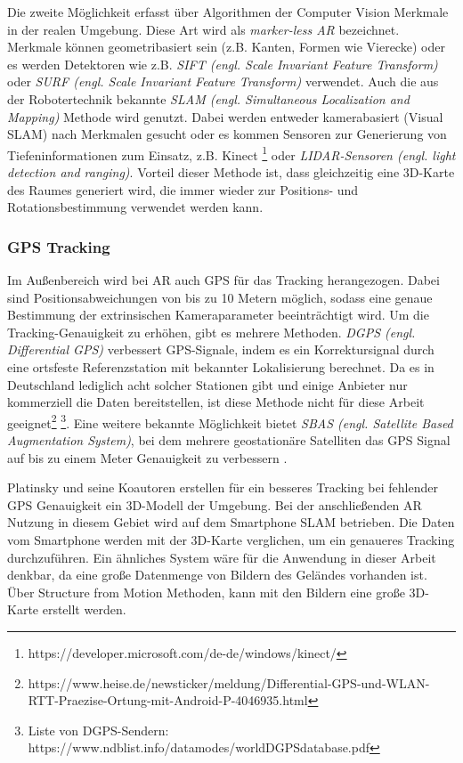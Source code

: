 Die zweite Möglichkeit erfasst über Algorithmen der Computer Vision Merkmale in der realen Umgebung. Diese Art wird als \textit{marker-less AR} bezeichnet. Merkmale können geometribasiert sein (z.B. Kanten, Formen wie Vierecke) oder es werden Detektoren wie z.B. \textit{SIFT (engl. Scale Invariant Feature Transform)}\cite{lowe_sift} oder \textit{SURF (engl. Scale Invariant Feature Transform)}\cite{bay_surf} verwendet. Auch die aus der Robotertechnik bekannte \textit{SLAM (engl. Simultaneous Localization and Mapping)}\cite{slam1} \cite{slam2} Methode wird genutzt. Dabei werden entweder kamerabasiert (Visual SLAM) nach Merkmalen gesucht oder es kommen Sensoren zur Generierung von Tiefeninformationen zum Einsatz, z.B. Kinect \footnote{https://developer.microsoft.com/de-de/windows/kinect/} oder \textit{LIDAR-Sensoren (engl. light detection and ranging)}\cite{liu_lai_lang}. Vorteil dieser Methode ist, dass gleichzeitig eine 3D-Karte des Raumes generiert wird, die immer wieder zur Positions- und Rotationsbestimmung verwendet werden kann.

\subsubsection{GPS Tracking}
Im Außenbereich wird bei AR auch GPS für das Tracking herangezogen. Dabei sind Positionsabweichungen von bis zu 10 Metern möglich, sodass eine genaue Bestimmung der extrinsischen Kameraparameter beeinträchtigt wird. Um die Tracking-Genauigkeit zu erhöhen, gibt es mehrere Methoden. \textit{DGPS (engl. Differential GPS)} verbessert GPS-Signale, indem es ein Korrektursignal durch eine ortsfeste Referenzstation mit bekannter Lokalisierung berechnet. Da es in Deutschland lediglich acht solcher Stationen gibt und einige Anbieter nur kommerziell die Daten bereitstellen, ist diese Methode nicht für diese Arbeit geeignet\footnote{https://www.heise.de/newsticker/meldung/Differential-GPS-und-WLAN-RTT-Praezise-Ortung-mit-Android-P-4046935.html} \footnote{Liste von DGPS-Sendern: https://www.ndblist.info/datamodes/worldDGPSdatabase.pdf}. Eine weitere bekannte Möglichkeit bietet \textit{SBAS (engl. Satellite Based Augmentation System)}, bei dem mehrere geostationäre Satelliten das GPS Signal auf bis zu einem Meter Genauigkeit zu verbessern \cite*{doerner}.

Platinsky und seine Koautoren\cite{platinsky} erstellen für ein besseres Tracking bei fehlender GPS Genauigkeit ein 3D-Modell der Umgebung. Bei der anschließenden AR Nutzung in diesem Gebiet wird auf dem Smartphone SLAM betrieben. Die Daten vom Smartphone werden mit der 3D-Karte verglichen, um ein genaueres Tracking durchzuführen. Ein ähnliches System wäre für die Anwendung in dieser Arbeit denkbar, da eine große Datenmenge von Bildern des Geländes vorhanden ist. Über Structure from Motion Methoden, kann mit den Bildern eine große 3D-Karte erstellt werden.

